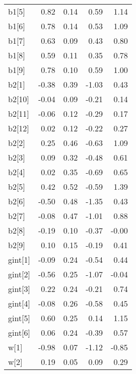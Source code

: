 \documentclass[12pt,]{article}
\begin{document}
\begin{table}[ht]
{\begin{tabular}{lrrrr}
  b1[5] & 0.82 & 0.14 & 0.59 & 1.14 \\ 
  b1[6] & 0.78 & 0.14 & 0.53 & 1.09 \\ 
  b1[7] & 0.63 & 0.09 & 0.43 & 0.80 \\ 
  b1[8] & 0.59 & 0.11 & 0.35 & 0.78 \\ 
  b1[9] & 0.78 & 0.10 & 0.59 & 1.00 \\ 
  b2[1] & -0.38 & 0.39 & -1.03 & 0.43 \\ 
  b2[10] & -0.04 & 0.09 & -0.21 & 0.14 \\ 
  b2[11] & -0.06 & 0.12 & -0.29 & 0.17 \\ 
  b2[12] & 0.02 & 0.12 & -0.22 & 0.27 \\ 
  b2[2] & 0.25 & 0.46 & -0.63 & 1.09 \\ 
  b2[3] & 0.09 & 0.32 & -0.48 & 0.61 \\ 
  b2[4] & 0.02 & 0.35 & -0.69 & 0.65 \\ 
  b2[5] & 0.42 & 0.52 & -0.59 & 1.39 \\ 
  b2[6] & -0.50 & 0.48 & -1.35 & 0.43 \\ 
  b2[7] & -0.08 & 0.47 & -1.01 & 0.88 \\ 
  b2[8] & -0.19 & 0.10 & -0.37 & -0.00 \\ 
  b2[9] & 0.10 & 0.15 & -0.19 & 0.41 \\ 
  gint[1] & -0.09 & 0.24 & -0.54 & 0.44 \\ 
  gint[2] & -0.56 & 0.25 & -1.07 & -0.04 \\ 
  gint[3] & 0.22 & 0.24 & -0.21 & 0.74 \\ 
  gint[4] & -0.08 & 0.26 & -0.58 & 0.45 \\ 
  gint[5] & 0.60 & 0.25 & 0.14 & 1.15 \\ 
  gint[6] & 0.06 & 0.24 & -0.39 & 0.57 \\ 
  w[1] & -0.98 & 0.07 & -1.12 & -0.85 \\ 
  w[2] & 0.19 & 0.05 & 0.09 & 0.29 \\ 
   \hline
\end{tabular}
}
\end{table}
\end{document}
